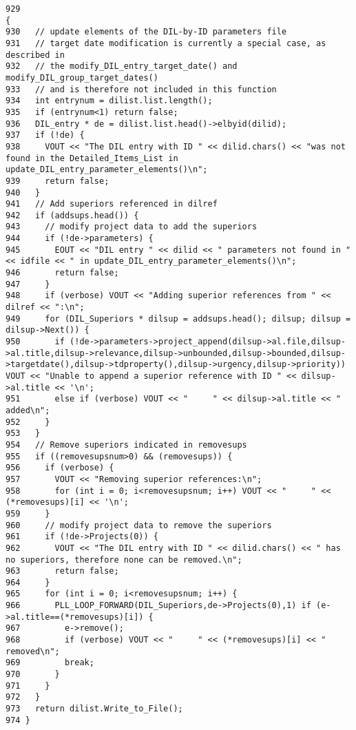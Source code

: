 \footnotesize\begin{verbatim}929                                                                                                                                                                    {
930   // update elements of the DIL-by-ID parameters file
931   // target date modification is currently a special case, as described in
932   // the modify_DIL_entry_target_date() and modify_DIL_group_target_dates()
933   // and is therefore not included in this function
934   int entrynum = dilist.list.length();
935   if (entrynum<1) return false;
936   DIL_entry * de = dilist.list.head()->elbyid(dilid);
937   if (!de) {
938     VOUT << "The DIL entry with ID " << dilid.chars() << "was not found in the Detailed_Items_List in update_DIL_entry_parameter_elements()\n";
939     return false;
940   }
941   // Add superiors referenced in dilref
942   if (addsups.head()) {
943     // modify project data to add the superiors
944     if (!de->parameters) {
945       EOUT << "DIL entry " << dilid << " parameters not found in " << idfile << " in update_DIL_entry_parameter_elements()\n";
946       return false;
947     }
948     if (verbose) VOUT << "Adding superior references from " << dilref << ":\n";
949     for (DIL_Superiors * dilsup = addsups.head(); dilsup; dilsup = dilsup->Next()) {
950       if (!de->parameters->project_append(dilsup->al.file,dilsup->al.title,dilsup->relevance,dilsup->unbounded,dilsup->bounded,dilsup->targetdate(),dilsup->tdproperty(),dilsup->urgency,dilsup->priority)) VOUT << "Unable to append a superior reference with ID " << dilsup->al.title << '\n';
951       else if (verbose) VOUT << "     " << dilsup->al.title << " added\n";
952     }
953   }
954   // Remove superiors indicated in removesups
955   if ((removesupsnum>0) && (removesups)) {
956     if (verbose) {
957       VOUT << "Removing superior references:\n";
958       for (int i = 0; i<removesupsnum; i++) VOUT << "     " << (*removesups)[i] << '\n';
959     }
960     // modify project data to remove the superiors
961     if (!de->Projects(0)) {
962       VOUT << "The DIL entry with ID " << dilid.chars() << " has no superiors, therefore none can be removed.\n";
963       return false;
964     }
965     for (int i = 0; i<removesupsnum; i++) {
966       PLL_LOOP_FORWARD(DIL_Superiors,de->Projects(0),1) if (e->al.title==(*removesups)[i]) {
967         e->remove();
968         if (verbose) VOUT << "     " << (*removesups)[i] << " removed\n";
969         break;
970       }
971     }
972   }
973   return dilist.Write_to_File();
974 }
\end{verbatim}\normalsize 
{}
